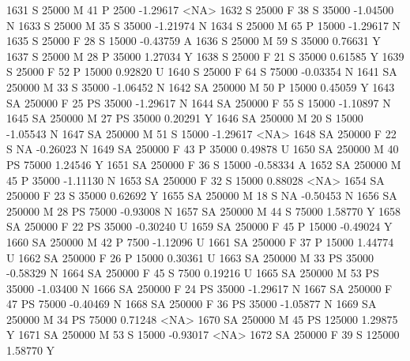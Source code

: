 \documentclass{article}
\begin{document}
\begin{Schunk}
\begin{Soutput}
1631      S      25000   M  41         P   2500  -1.29617 <NA>
1632      S      25000   F  38         S  35000  -1.04500    N
1633      S      25000   M  35         S  35000  -1.21974    N
1634      S      25000   M  65         P  15000  -1.29617    N
1635      S      25000   F  28         S  15000  -0.43759    A
1636      S      25000   M  59         S  35000   0.76631    Y
1637      S      25000   M  28         P  35000   1.27034    Y
1638      S      25000   F  21         S  35000   0.61585    Y
1639      S      25000   F  52         P  15000   0.92820    U
1640      S      25000   F  64         S  75000  -0.03354    N
1641     SA     250000   M  33         S  35000  -1.06452    N
1642     SA     250000   M  50         P  15000   0.45059    Y
1643     SA     250000   F  25        PS  35000  -1.29617    N
1644     SA     250000   F  55         S  15000  -1.10897    N
1645     SA     250000   M  27        PS  35000   0.20291    Y
1646     SA     250000   M  20         S  15000  -1.05543    N
1647     SA     250000   M  51         S  15000  -1.29617 <NA>
1648     SA     250000   F  22         S     NA  -0.26023    N
1649     SA     250000   F  43         P  35000   0.49878    U
1650     SA     250000   M  40        PS  75000   1.24546    Y
1651     SA     250000   F  36         S  15000  -0.58334    A
1652     SA     250000   M  45         P  35000  -1.11130    N
1653     SA     250000   F  32         S  15000   0.88028 <NA>
1654     SA     250000   F  23         S  35000   0.62692    Y
1655     SA     250000   M  18         S     NA  -0.50453    N
1656     SA     250000   M  28        PS  75000  -0.93008    N
1657     SA     250000   M  44         S  75000   1.58770    Y
1658     SA     250000   F  22        PS  35000  -0.30240    U
1659     SA     250000   F  45         P  15000  -0.49024    Y
1660     SA     250000   M  42         P   7500  -1.12096    U
1661     SA     250000   F  37         P  15000   1.44774    U
1662     SA     250000   F  26         P  15000   0.30361    U
1663     SA     250000   M  33        PS  35000  -0.58329    N
1664     SA     250000   F  45         S   7500   0.19216    U
1665     SA     250000   M  53        PS  35000  -1.03400    N
1666     SA     250000   F  24        PS  35000  -1.29617    N
1667     SA     250000   F  47        PS  75000  -0.40469    N
1668     SA     250000   F  36        PS  35000  -1.05877    N
1669     SA     250000   M  34        PS  75000   0.71248 <NA>
1670     SA     250000   M  45        PS 125000   1.29875    Y
1671     SA     250000   M  53         S  15000  -0.93017 <NA>
1672     SA     250000   F  39         S 125000   1.58770    Y

\end{Soutput}
\end{Schunk}
\end{document}

